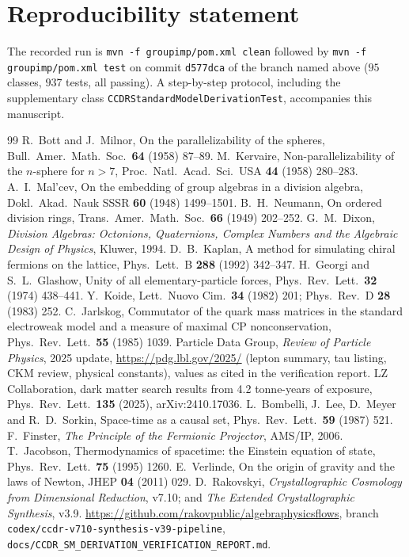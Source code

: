 \documentclass[11pt,a4paper]{article}
\theoremstyle{definition}
\theoremstyle{remark}
\newcommand{\code}[1]{\texttt{#1}}
\begin{document}
\section*{Reproducibility statement}
The recorded run is \code{mvn -f groupimp/pom.xml clean} followed by \code{mvn -f groupimp/pom.xml test} on commit \code{d577dca} of the branch named above ($95$ classes, $937$ tests, all passing). A step-by-step protocol, including the supplementary class \code{CCDRStandardModelDerivationTest}, accompanies this manuscript.

\begin{thebibliography}{99}
 R.~Bott and J.~Milnor, On the parallelizability of the spheres, Bull.\ Amer.\ Math.\ Soc.\ \textbf{64} (1958) 87--89.
 M.~Kervaire, Non-parallelizability of the $n$-sphere for $n>7$, Proc.\ Natl.\ Acad.\ Sci.\ USA \textbf{44} (1958) 280--283.
 A.~I.~Mal'cev, On the embedding of group algebras in a division algebra, Dokl.\ Akad.\ Nauk SSSR \textbf{60} (1948) 1499--1501.
 B.~H.~Neumann, On ordered division rings, Trans.\ Amer.\ Math.\ Soc.\ \textbf{66} (1949) 202--252.
 G.~M.~Dixon, \emph{Division Algebras: Octonions, Quaternions, Complex Numbers and the Algebraic Design of Physics}, Kluwer, 1994.
 D.~B.~Kaplan, A method for simulating chiral fermions on the lattice, Phys.\ Lett.\ B \textbf{288} (1992) 342--347.
 H.~Georgi and S.~L.~Glashow, Unity of all elementary-particle forces, Phys.\ Rev.\ Lett.\ \textbf{32} (1974) 438--441.
 Y.~Koide, Lett.\ Nuovo Cim.\ \textbf{34} (1982) 201; Phys.\ Rev.\ D \textbf{28} (1983) 252.
 C.~Jarlskog, Commutator of the quark mass matrices in the standard electroweak model and a measure of maximal CP nonconservation, Phys.\ Rev.\ Lett.\ \textbf{55} (1985) 1039.
 Particle Data Group, \emph{Review of Particle Physics}, 2025 update, \url{https://pdg.lbl.gov/2025/} (lepton summary, tau listing, CKM review, physical constants), values as cited in the verification report.
 LZ Collaboration, dark matter search results from 4.2 tonne-years of exposure, Phys.\ Rev.\ Lett.\ \textbf{135} (2025), arXiv:2410.17036.
 L.~Bombelli, J.~Lee, D.~Meyer and R.~D.~Sorkin, Space-time as a causal set, Phys.\ Rev.\ Lett.\ \textbf{59} (1987) 521.
 F.~Finster, \emph{The Principle of the Fermionic Projector}, AMS/IP, 2006.
 T.~Jacobson, Thermodynamics of spacetime: the Einstein equation of state, Phys.\ Rev.\ Lett.\ \textbf{75} (1995) 1260.
 E.~Verlinde, On the origin of gravity and the laws of Newton, JHEP \textbf{04} (2011) 029.
 D.~Rakovskyi, \emph{Crystallographic Cosmology from Dimensional Reduction}, v7.10; and \emph{The Extended Crystallographic Synthesis}, v3.9.
 \url{https://github.com/rakovpublic/algebraphysicsflows}, branch \texttt{codex/ccdr-v710-synthesis-v39-pipeline}, \texttt{docs/CCDR\_SM\_DERIVATION\_VERIFICATION\_REPORT.md}.
\end{thebibliography}
\end{document}
